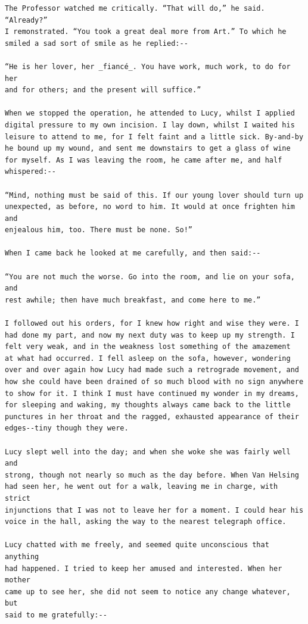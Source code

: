 \documentclass{article}
\begin{document}
\begin{verbatim}
The Professor watched me critically. “That will do,” he said. “Already?”
I remonstrated. “You took a great deal more from Art.” To which he
smiled a sad sort of smile as he replied:--

“He is her lover, her _fiancé_. You have work, much work, to do for her
and for others; and the present will suffice.”

When we stopped the operation, he attended to Lucy, whilst I applied
digital pressure to my own incision. I lay down, whilst I waited his
leisure to attend to me, for I felt faint and a little sick. By-and-by
he bound up my wound, and sent me downstairs to get a glass of wine
for myself. As I was leaving the room, he came after me, and half
whispered:--

“Mind, nothing must be said of this. If our young lover should turn up
unexpected, as before, no word to him. It would at once frighten him and
enjealous him, too. There must be none. So!”

When I came back he looked at me carefully, and then said:--

“You are not much the worse. Go into the room, and lie on your sofa, and
rest awhile; then have much breakfast, and come here to me.”

I followed out his orders, for I knew how right and wise they were. I
had done my part, and now my next duty was to keep up my strength. I
felt very weak, and in the weakness lost something of the amazement
at what had occurred. I fell asleep on the sofa, however, wondering
over and over again how Lucy had made such a retrograde movement, and
how she could have been drained of so much blood with no sign anywhere
to show for it. I think I must have continued my wonder in my dreams,
for sleeping and waking, my thoughts always came back to the little
punctures in her throat and the ragged, exhausted appearance of their
edges--tiny though they were.

Lucy slept well into the day; and when she woke she was fairly well and
strong, though not nearly so much as the day before. When Van Helsing
had seen her, he went out for a walk, leaving me in charge, with strict
injunctions that I was not to leave her for a moment. I could hear his
voice in the hall, asking the way to the nearest telegraph office.

Lucy chatted with me freely, and seemed quite unconscious that anything
had happened. I tried to keep her amused and interested. When her mother
came up to see her, she did not seem to notice any change whatever, but
said to me gratefully:--


\end{verbatim}
\end{document}
